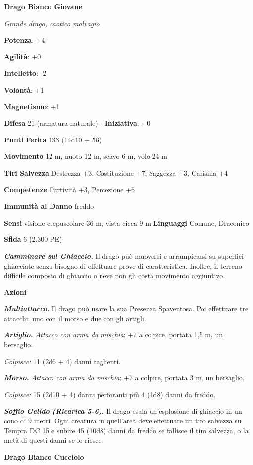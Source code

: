 \begin{multicols}{2}
\textbf{Drago Bianco Giovane}

\emph{Grande drago, caotico malvagio}

\textbf{Potenza}: +4

\textbf{Agilità}: +0

\textbf{Intelletto}: -2

\textbf{Volontà}: +1

\textbf{Magnetismo}: +1

\textbf{Difesa} 21 (armatura naturale) - \textbf{Iniziativa}: +0

\textbf{Punti Ferita} 133 (14d10 + 56)

\textbf{Movimento} 12 m, nuoto 12 m, scavo 6 m, volo 24 m

\textbf{Tiri Salvezza} Destrezza +3, Costituzione +7, Saggezza +3,
Carisma +4

\textbf{Competenze} Furtività +3, Percezione +6

\textbf{Immunità al Danno} freddo

\textbf{Sensi} visione crepuscolare 36 m, vista cieca 9 m
\textbf{Linguaggi} Comune, Draconico

\textbf{Sfida} 6 (2.300 PE)

\emph{\textbf{Camminare sul Ghiaccio.}} Il drago può muoversi e
arrampicarsi su superfici ghiacciate senza bisogno di effettuare prove
di caratteristica. Inoltre, il terreno difficile composto di ghiaccio o
neve non gli costa movimento aggiuntivo.

\textbf{Azioni}

\emph{\textbf{Multiattacco.}} Il drago può usare la sua Presenza
Spaventosa. Poi effettuare tre attacchi: uno con il morso e due con gli
artigli.

\emph{\textbf{Artiglio.} Attacco con arma da mischia}: +7 a colpire,
portata 1,5 m, un bersaglio.

\emph{Colpisce:} 11 (2d6 + 4) danni taglienti.

\emph{\textbf{Morso.} Attacco con arma da mischia}: +7 a colpire,
portata 3 m, un bersaglio.

\emph{Colpisce:} 15 (2d10 + 4) danni perforanti più 4 (1d8) danni da
freddo.

\emph{\textbf{Soffio Gelido (Ricarica 5-6).}} Il drago esala
un'esplosione di ghiaccio in un cono di 9 metri. Ogni creatura in
quell'area deve effettuare un tiro salvezza su Tempra DC 15 e
subire 45 (10d8) danni da freddo se fallisce il tiro salvezza, o la metà
di questi danni se lo riesce.

\textbf{Drago Bianco Cucciolo}


\end{multicols}
